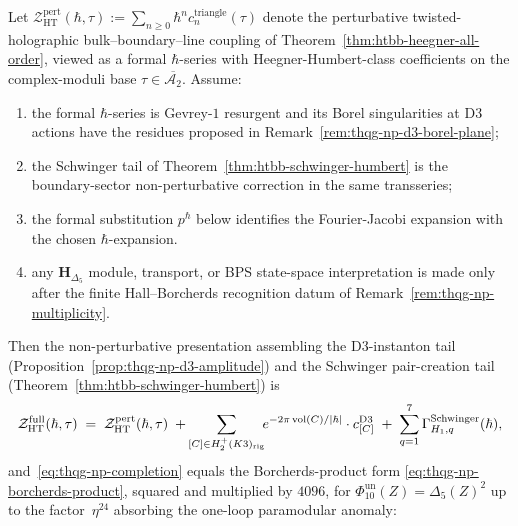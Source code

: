 \begin{theorem}
\label{thm:thqg-np-d3-completion}
Let
$\mathcal{Z}^{\mathrm{pert}}_{\mathrm{HT}}(\hbar, \tau)
:= \sum_{n\geq 0}\hbar^n c_n^{\mathrm{triangle}}(\tau)$
denote the perturbative twisted-holographic bulk--boundary--line
coupling of Theorem~\ref{thm:htbb-heegner-all-order}, viewed as a
formal $\hbar$-series with Heegner-Humbert-class coefficients on the
complex-moduli base $\tau\in\overline{\mathcal{A}_2}$. Assume:
\begin{enumerate}[label=\textup{(\alph*)}]
\item the formal $\hbar$-series is Gevrey-$1$ resurgent and its
Borel singularities at D$3$ actions have the residues proposed in
Remark~\ref{rem:thqg-np-d3-borel-plane};
\item the Schwinger tail of Theorem~\ref{thm:htbb-schwinger-humbert}
is the boundary-sector non-perturbative correction in the same
transseries;
\item the formal substitution $p^\hbar$ below identifies the
Fourier-Jacobi expansion with the chosen $\hbar$-expansion.
\item any $\mathbf H_{\Delta_5}$ module, transport, or BPS
state-space interpretation is made only after the finite
Hall--Borcherds recognition datum of
Remark~\ref{rem:thqg-np-multiplicity}.
\end{enumerate}
Then the non-perturbative presentation assembling the D$3$-instanton tail
(Proposition~\ref{prop:thqg-np-d3-amplitude}) and the Schwinger
pair-creation tail
(Theorem~\ref{thm:htbb-schwinger-humbert}) is
\begin{equation}\label{eq:thqg-np-completion}
 \mathcal{Z}^{\mathrm{full}}_{\mathrm{HT}}(\hbar, \tau)
 \;=\; \mathcal{Z}^{\mathrm{pert}}_{\mathrm{HT}}(\hbar, \tau)
 \;+\;\!\!\sum_{[C]\in H_2^+(K3)_{\mathrm{rig}}}\!\!
 e^{-2\pi\operatorname{vol}(C)/|\hbar|}\cdot c^{\mathrm{D3}}_{[C]}
 \;+\; \sum_{q = 1}^{7}\Gamma^{\mathrm{Schwinger}}_{H_1, q}(\hbar),
\end{equation}
and~\eqref{eq:thqg-np-completion} equals the Borcherds-product form
\eqref{eq:thqg-np-borcherds-product}, squared and multiplied by
$4096$, for $\Phi_{10}^{\mathrm{un}}(Z)=\Delta_5(Z)^2$ up to the
factor~$\eta^{24}$ absorbing the one-loop paramodular anomaly:
\begin{equation}\label{eq:thqg-np-phi10-identity}

\end{equation}
\end{theorem}
